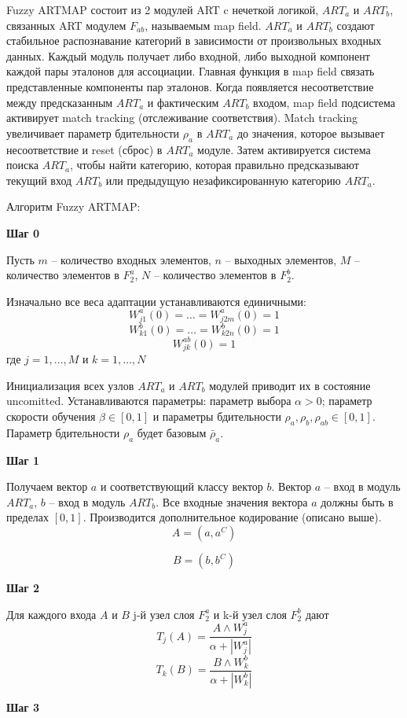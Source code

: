 Fuzzy ARTMAP состоит из 2 модулей ART c нечеткой логикой, $ART_a$ и $ART_b$, связанных ART модулем $F_{ab}$, называемым map field. $ART_a$ и $ART_b$ создают стабильное распознавание категорий в зависимости от произвольных входных данных. Каждый модуль получает либо входной, либо выходной компонент каждой пары эталонов для ассоциации. Главная функция в map field связать представленные компоненты пар эталонов. Когда появляется несоответствие между предсказанным $ART_a$ и фактическим $ART_b$ входом, map field подсистема активирует match tracking (отслеживание соответствия). Match tracking увеличивает параметр бдительности $\rho_a$ в $ART_a$ до значения, которое вызывает несоответствие и reset (сброс) в $ART_a$ модуле. Затем активируется система поиска $ART_a$, чтобы найти категорию, которая правильно предсказывают текущий вход $ART_b$ или предыдущую незафиксированную категорию $ART_a$.

Алгоритм Fuzzy ARTMAP:

\textbf{Шаг 0}

Пусть $m$  -- количество входных элементов, $n$ -- выходных элементов, $M$ -- количество элементов в $F_2^a$, $N$ -- количество элементов в $F_2^b$.

Изначально все веса адаптации устанавливаются единичными:
$$
	W_{j1}^a(0) = \ldots = W_{j2m}^a(0) = 1 
$$
$$
	W_{k1}^b(0) = \ldots = W_{k2n}^b(0) = 1 
$$
$$
	W_{jk}^{ab}(0) = 1 
$$
где $j=1, \ldots, M$ и $k=1, \ldots, N$

Инициализация всех узлов $ART_a$ и $ART_b$ модулей приводит их в состояние uncomitted. Устанавливаются параметры: параметр выбора $\alpha > 0$; параметр скорости обучения $\beta \in [0,1]$ и параметры бдительности $\rho_a, \rho_b, \rho_{ab} \in [0,1]$. Параметр бдительности $\rho_a$ будет базовым $\bar{\rho}_a$.

\textbf{Шаг 1}

Получаем вектор $a$ и соответствующий классу вектор $b$. Вектор $a$ -- вход в модуль $ART_a$, $b$ -- вход в модуль $ART_b$. Все входные значения вектора $a$ должны быть в пределах $[0,1]$. Производится дополнительное кодирование (описано выше).
$$ 
	A = (a,a^C)
$$

$$ 
	B = (b,b^C)
$$

\textbf{Шаг 2}

Для каждого входа $A$ и $B$ j-й узел слоя $F_2^a$ и k-й узел слоя $F_2^b$ дают
$$ 
	T_j (A) = \frac{A \wedge W_j^a}{\alpha + |W_j^a|} 
$$
$$ 
	T_k (B) = \frac{B \wedge W_k^b}{\alpha + |W_k^b|} 
$$

\textbf{Шаг 3}

